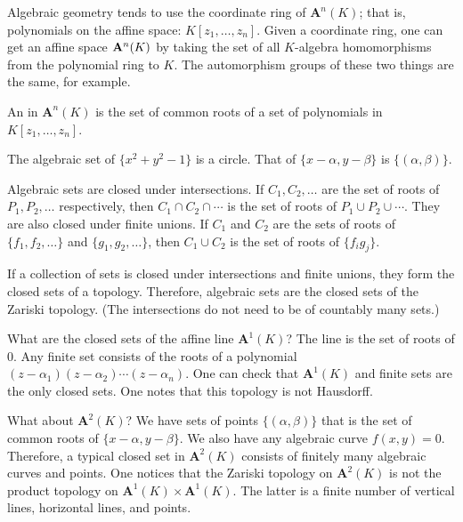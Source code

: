 \documentclass [11 pt, oneside] {article}
\begin{document}
Algebraic geometry tends to use the coordinate ring of $\mathbf{A}^n(K)$; that is, polynomials on the affine space: $K[z_1,\hdots, z_n]$. Given a coordinate ring, one can get an affine space $\mathbf{A}^n(K)$ by taking the set of all $K$-algebra homomorphisms from the polynomial ring to $K$. The automorphism groups of these two things are the same, for example.

\begin{definition}\label{}
An  in $\mathbf{A}^n(K)$ is the set of common roots of a set of polynomials in $K[z_1,\hdots, z_n]$.
\end{definition}

\begin{example}[ ]\label{}
The algebraic set of $\{x^2+y^2-1\}$ is a circle. That of $\{x-\alpha,y-\beta\}$ is $\{(\alpha,\beta)\}$.
\end{example}

Algebraic sets are closed under intersections. If $C_1,C_2,\hdots $ are the set of roots of $P_1,P_2,\hdots$ respectively, then $C_1\cap C_2\cap \cdots $ is the set of roots of $P_1\cup P_2\cup \cdots$. They are also closed under finite unions. If $C_1$ and $C_2$ are the sets of roots of $\{f_1,f_2,\hdots\}$ and $\{g_1,g_2,\hdots\}$, then $C_1\cup C_2$ is the set of roots of $\{f_ig_j\}$.

If a collection of sets is closed under intersections and finite unions, they form the closed sets of a topology. Therefore, algebraic sets are the closed sets of the Zariski topology. (The intersections do not need to be of countably many sets.)

What are the closed sets of the affine line $\mathbf{A}^1(K)$? The line is the set of roots of $0$. Any finite set consists of the roots of a polynomial $(z-\alpha_1)(z-\alpha_2)\cdots(z-\alpha_n)$. One can check that $\mathbf{A}^1(K)$ and finite sets are the only closed sets. One notes that this topology is not Hausdorff.

What about $\mathbf{A}^2(K)$? We have sets of points $\{(\alpha,\beta)\}$ that is the set of common roots of $\{x-\alpha, y-\beta\}$. We also have any algebraic curve $f(x,y) =0$. Therefore, a typical closed set in $\mathbf{A}^2(K)$ consists of finitely many algebraic curves and points. One notices that the Zariski topology on $\mathbf{A}^2(K)$ is not the product topology on $\mathbf{A}^1(K)\times \mathbf{A}^1(K)$. The latter is a finite number of vertical lines, horizontal lines, and points.
\end{document}
